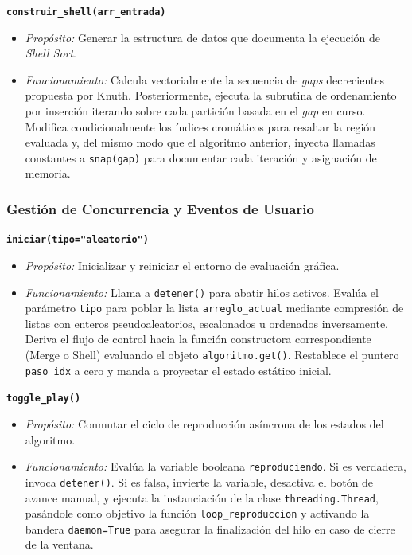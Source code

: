 \documentclass[conference]{IEEEtran}
\begin{document}
\vspace{0.2cm}
\noindent \textbf{\texttt{construir\_shell(arr\_entrada)}}
\begin{itemize}
    \item \textit{Propósito:} Generar la estructura de datos que documenta la ejecución de \textit{Shell Sort}.
    \item \textit{Funcionamiento:} Calcula vectorialmente la secuencia de \textit{gaps} decrecientes propuesta por Knuth. Posteriormente, ejecuta la subrutina de ordenamiento por inserción iterando sobre cada partición basada en el \textit{gap} en curso. Modifica condicionalmente los índices cromáticos para resaltar la región evaluada y, del mismo modo que el algoritmo anterior, inyecta llamadas constantes a \texttt{snap(gap)} para documentar cada iteración y asignación de memoria.
\end{itemize}

\subsubsection{Gestión de Concurrencia y Eventos de Usuario}
\vspace{0.2cm}
\noindent \textbf{\texttt{iniciar(tipo="aleatorio")}}
\begin{itemize}
    \item \textit{Propósito:} Inicializar y reiniciar el entorno de evaluación gráfica.
    \item \textit{Funcionamiento:} Llama a \texttt{detener()} para abatir hilos activos. Evalúa el parámetro \texttt{tipo} para poblar la lista \texttt{arreglo\_actual} mediante compresión de listas con enteros pseudoaleatorios, escalonados u ordenados inversamente. Deriva el flujo de control hacia la función constructora correspondiente (Merge o Shell) evaluando el objeto \texttt{algoritmo.get()}. Restablece el puntero \texttt{paso\_idx} a cero y manda a proyectar el estado estático inicial.
\end{itemize}

\vspace{0.2cm}
\noindent \textbf{\texttt{toggle\_play()}}
\begin{itemize}
    \item \textit{Propósito:} Conmutar el ciclo de reproducción asíncrona de los estados del algoritmo.
    \item \textit{Funcionamiento:} Evalúa la variable booleana \texttt{reproduciendo}. Si es verdadera, invoca \texttt{detener()}. Si es falsa, invierte la variable, desactiva el botón de avance manual, y ejecuta la instanciación de la clase \texttt{threading.Thread}, pasándole como objetivo la función \texttt{loop\_reproduccion} y activando la bandera \texttt{daemon=True} para asegurar la finalización del hilo en caso de cierre de la ventana.
\end{itemize}
\end{document}
